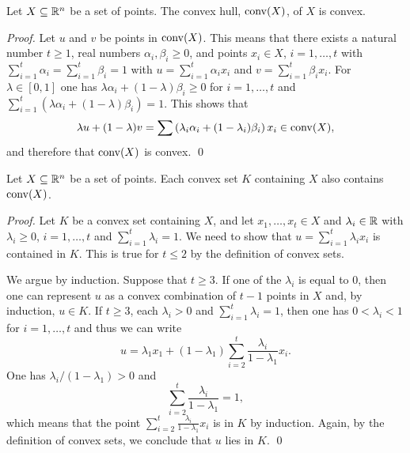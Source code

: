 \begin{theorem}
  \label{conv:thr:1}
  Let $X\subseteq\mathbb{R}^n$ be a set of points. The convex hull, $\operatorname{conv}(X)$,  of $X$
  is convex. 
\end{theorem}

\begin{proof}
  Let $u$ and $v$ be points in $\operatorname{conv}(X)$. This means that there exists
  a natural number $t\geq1$,  real numbers  $\alpha_i,\beta_i\geq0$, and points $x_i
  \in X$,  $i=1,\ldots,t$ with
  $\sum_{i=1}^t \alpha_i = \sum_{i=1}^t \beta_i =1$ with  $u =  \sum_{i=1}^t
  \alpha_ix_i$  and $v = \sum_{i=1}^t \beta_ix_i$. For $\lambda \in [0,1]$ one has 
  $\lambda\alpha_i+(1-\lambda)\beta_i\geq0$ for $i=1,\ldots,t$  and $\sum_{i=1}^t
  \left(\lambda\alpha_i+(1-\lambda)\beta_i \right) =1$. This shows that   
  \begin{displaymath}
    \lambda u + (1-\lambda) v  =  \sum \left(\lambda_i \alpha_i + (1- \lambda_i) \beta_i\right)
    x_i  \in \operatorname{conv}(X),
  \end{displaymath}
  and therefore that $\operatorname{conv}(X)$ is convex. 
\qed \end{proof}

\begin{theorem}
  \label{conv:thr:2}
  Let $X\subseteq\mathbb{R}^n$ be a set of points. Each convex set $K$ containing $X$
  also contains $\operatorname{conv}(X)$. 
\end{theorem}

\begin{proof}
  Let $K$ be a convex set containing $X$, 
  and let $x_1,\ldots,x_t\in X$ and $\lambda_i\in \mathbb{R}$ with $\lambda_i\geq0$, $i=1,\ldots,t$ and
  $\sum_{i=1}^t  \lambda_i =1$. We need to show that $u = \sum_{i=1}^t \lambda_i
  x_i$ is contained in  $K$.   This is true for $t\leq2$ by the definition
  of convex sets.  

  We argue by induction.  Suppose that $t\geq3$. If one of the $\lambda_i$ is
  equal   to $0$, then one can represent $u$ as a convex combination
  of $t-1$ points in $X$ and, by induction, $u \in K$. If    $t\geq3$,
  each $\lambda_i>0$ and $\sum_{i=1}^t \lambda_i = 1$, then one has $0<\lambda_i<1$ for
  $i=1,\ldots,t$ and thus we can write 
  \begin{displaymath}
    u = \lambda_1 x_1 + (1-\lambda_1) \sum_{i=2}^t \frac{\lambda_i}{1-\lambda_1} x_i. 
  \end{displaymath}
  One has $\lambda_i / (1-\lambda_1)>0$ and 
  \begin{displaymath}
    \sum_{i=2}^t \frac{\lambda_i}{1-\lambda_1} = 1,
  \end{displaymath}
  which means that the point $\sum_{i=2}^t \frac{\lambda_i}{1-\lambda_1} x_i$ is in
  $K$ by induction. Again, by the definition of convex sets, we
  conclude that $u$ lies in $K$. 
\qed \end{proof}

